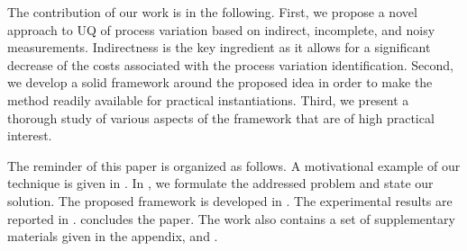 The contribution of our work is in the following. First, we propose a novel approach to UQ of process variation based on indirect, incomplete, and noisy measurements. Indirectness is the key ingredient as it allows for a significant decrease of the costs associated with the process variation identification. Second, we develop a solid framework around the proposed idea in order to make the method readily available for practical instantiations. Third, we present a thorough study of various aspects of the framework that are of high practical interest.

The reminder of this paper is organized as follows. A motivational example of our technique is given in . In , we formulate the addressed problem and state our solution. The proposed framework is developed in . The experimental results are reported in .  concludes the paper. The work also contains a set of supplementary materials given in the appendix,  and .
